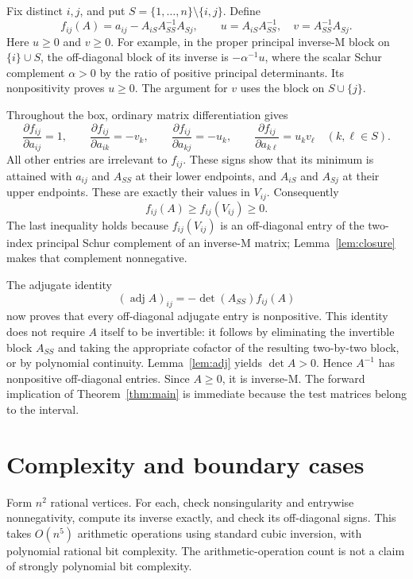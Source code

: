 \documentclass[11pt,a4paper]{article}
\theoremstyle{remark}\newtheorem{remark}[theorem]{Remark}
\newcommand{\adj}{\operatorname{adj}}
\begin{document}
Fix distinct $i,j$, and put $S=\{1,\ldots,n\}\setminus\{i,j\}$. Define
\[
 f_{ij}(A)=a_{ij}-A_{iS}A_{SS}^{-1}A_{Sj},\qquad
 u=A_{iS}A_{SS}^{-1},\quad v=A_{SS}^{-1}A_{Sj}.
\]
Here $u\ge0$ and $v\ge0$. For example, in the proper principal inverse-M block on $\{i\}\cup S$, the off-diagonal block of its inverse is $-\alpha^{-1}u$, where the scalar Schur complement $\alpha>0$ by the ratio of positive principal determinants. Its nonpositivity proves $u\ge0$. The argument for $v$ uses the block on $S\cup\{j\}$.

Throughout the box, ordinary matrix differentiation gives
\[
 \frac{\partial f_{ij}}{\partial a_{ij}}=1,\qquad
 \frac{\partial f_{ij}}{\partial a_{ik}}=-v_k,\qquad
 \frac{\partial f_{ij}}{\partial a_{kj}}=-u_k,\qquad
 \frac{\partial f_{ij}}{\partial a_{k\ell}}=u_kv_\ell
 \quad(k,\ell\in S).
\]
All other entries are irrelevant to $f_{ij}$. These signs show that its minimum is attained with $a_{ij}$ and $A_{SS}$ at their lower endpoints, and $A_{iS}$ and $A_{Sj}$ at their upper endpoints. These are exactly their values in $V_{ij}$. Consequently
\[
 f_{ij}(A)\ge f_{ij}(V_{ij})\ge0.
\]
The last inequality holds because $f_{ij}(V_{ij})$ is an off-diagonal entry of the two-index principal Schur complement of an inverse-M matrix; Lemma~\ref{lem:closure} makes that complement nonnegative.

The adjugate identity
\[
 (\adj A)_{ij}=-\det(A_{SS})f_{ij}(A)
\]
now proves that every off-diagonal adjugate entry is nonpositive. This identity does not require $A$ itself to be invertible: it follows by eliminating the invertible block $A_{SS}$ and taking the appropriate cofactor of the resulting two-by-two block, or by polynomial continuity. Lemma~\ref{lem:adj} yields $\det A>0$. Hence $A^{-1}$ has nonpositive off-diagonal entries. Since $A\ge0$, it is inverse-M. The forward implication of Theorem~\ref{thm:main} is immediate because the test matrices belong to the interval.
\section{Complexity and boundary cases}
Form $n^2$ rational vertices. For each, check nonsingularity and entrywise nonnegativity, compute its inverse exactly, and check its off-diagonal signs. This takes $O(n^5)$ arithmetic operations using standard cubic inversion, with polynomial rational bit complexity. The arithmetic-operation count is not a claim of strongly polynomial bit complexity.
\end{document}
